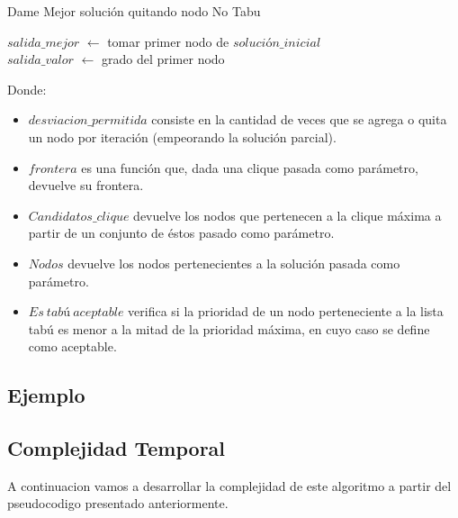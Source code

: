 \begin{algorithm}[H]
    \SetAlgoLined
    \caption{Dame Mejor solución quitando nodo No Tabu}

	$salida\_mejor$ $\leftarrow$ tomar primer nodo de $solución\_inicial$ \\
	$salida\_valor$ $\leftarrow$ grado del primer nodo \\

\end{algorithm}

Donde:
\begin{itemize}
 \item $desviacion\_permitida$ consiste en la cantidad de veces que se agrega o quita un nodo por iteración (empeorando la solución parcial).
 \item $frontera$ es una función que, dada una clique pasada como parámetro, devuelve su frontera.
 \item $Candidatos\_clique$ devuelve los nodos que pertenecen a la clique máxima a partir de un conjunto de éstos pasado como parámetro.
 \item $Nodos$ devuelve los nodos pertenecientes a la solución pasada como parámetro.
 \item $Es\ tabú\ aceptable$ verifica si la prioridad de un nodo perteneciente a la lista tabú es menor a la mitad de la prioridad máxima, en cuyo caso se define como aceptable.
\end{itemize}

\subsection{Ejemplo}
\subsection{Complejidad Temporal}

 A continuacion vamos a desarrollar la complejidad de este algoritmo a partir del pseudocodigo presentado anteriormente. \newline

